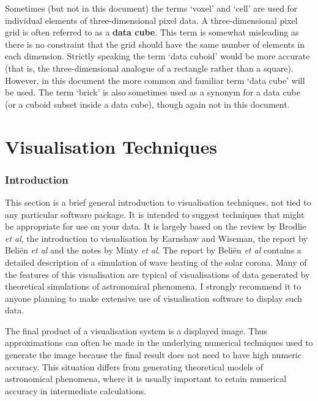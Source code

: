 \documentclass[twoside,11pt]{article}
\newcommand{\stardocinitials}  {SG}
\newcommand{\stardocnumber}    {8.2}
\newcommand{\stardocname}{\stardocinitials /\stardocnumber}
\newcommand{\htmladdnormallink}[2]{#1}
\newcommand{\xlabel}[1]{}
\begin{document}
Sometimes (but not in this document) the terms `voxel' and `cell' are
used for individual elements of three-dimensional pixel data. A
three-dimensional pixel grid is often referred to as a {\bf data cube}.
This term is somewhat misleading as there is no constraint that the grid
should have the same number of elements in each dimension. Strictly
speaking the term `data cuboid' would be more accurate (that is, the
three-dimensional analogue of a rectangle rather than a square). However,
in this document the more common and familiar term `data cube' will be used.
The term `brick' is also sometimes used as a synonym for a data cube (or
a cuboid subset inside a data cube), though again not in this document.


\cleardoublepage
\markboth{\stardocname}{\stardocname}
\part{Visualisation Techniques}
\markboth{\stardocname}{\stardocname}

\section{Introduction \xlabel{INTRO_TECH} }

This section is a brief general introduction to visualisation techniques,
not tied to any particular software package. It is intended to suggest
techniques that might be appropriate for use on your data. It is largely
based on the review by \htmladdnormallink{Brodlie {\it et al}}
{http://www.agocg.ac.uk:8080/agocg/New/TechReports/VisSyst/dogbook_1.html}\cite{BRODLIE},
the introduction to visualisation by Earnshaw and Wiseman\cite{EARNSHAW},
the report by \htmladdnormallink{Beli\"{e}n {\it et al}}
{http://www.sara.nl/Rik/REPORT.update}\cite{BELIEN} and the notes by
Minty {\it et al}\cite{MINTY}. The report by Beli\"{e}n {\it et
al}\cite{BELIEN} contains a detailed description of a simulation of wave
heating of the solar corona. Many of the features of this visualisation
are typical of visualisations of data generated by theoretical
simulations of astronomical phenomena. I strongly recommend it to anyone
planning to make extensive use of visualisation software to display such
data.

The final product of a visualisation system is a displayed image. Thus
approximations can often be made in the underlying numerical techniques
used to generate the image because the final result does not need to have
high numeric accuracy. This situation differs from generating
theoretical models of astronomical phenomena, where it is usually
important to retain numerical accuracy in intermediate calculations.
\end{document}
